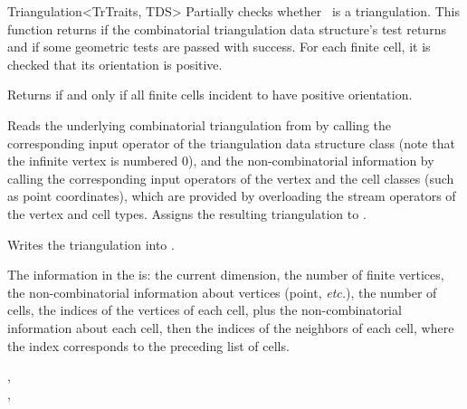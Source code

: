 \begin{ccRefClass}{Triangulation<TrTraits, TDS>}
{Partially checks whether \ccVar\ is a triangulation. This function returns
 if the combinatorial triangulation data structure's 
test returns  and if some geometric tests are passed with success.
For each finite cell, it is checked that its orientation is
positive.}

 {Returns  if and only if all
finite cells incident to  have positive orientation.}


{Reads the underlying combinatorial triangulation from  by
calling the corresponding input operator of the triangulation data
structure class (note that the infinite vertex is numbered 0), and the
non-combinatorial information by calling the corresponding input
operators of the vertex and the cell classes (such as point
coordinates), which are provided by overloading the stream operators
of the vertex and cell types. Assigns the resulting triangulation to
.}

{Writes the triangulation  into .}

The information in the  is: the current dimension, the number of
finite vertices, the non-combinatorial information about vertices (point,
\emph{etc.}), the number of cells, the indices of the vertices of each
cell, plus the non-combinatorial information about each cell, then the
indices of the neighbors of each cell, where the index corresponds to the
preceding list of cells.

\ccSeeAlso

,\\
,\\

\end{ccRefClass}

